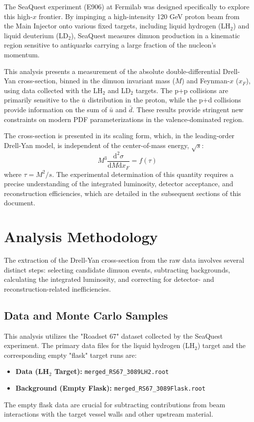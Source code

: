 \documentclass[11pt]{article}
\newcommand{\diffd}{\mathrm{d}}
\begin{document}
The SeaQuest experiment (E906) at Fermilab was designed specifically to explore this high-$x$ frontier. By impinging a high-intensity 120 GeV proton beam from the Main Injector onto various fixed targets, including liquid hydrogen (LH$_2$) and liquid deuterium (LD$_2$), SeaQuest measures dimuon production in a kinematic region sensitive to antiquarks carrying a large fraction of the nucleon's momentum.

This analysis presents a measurement of the absolute double-differential Drell-Yan cross-section, binned in the dimuon invariant mass ($M$) and Feynman-$x$ ($x_F$), using data collected with the LH$_2$ and LD$_2$ targets. The p+p collisions are primarily sensitive to the $\bar{u}$ distribution in the proton, while the p+d collisions provide information on the sum of $\bar{u}$ and $\bar{d}$. These results provide stringent new constraints on modern PDF parameterizations in the valence-dominated region.

The cross-section is presented in its scaling form, which, in the leading-order Drell-Yan model, is independent of the center-of-mass energy, $\sqrt{s}$:
\begin{equation}
    M^{3}\frac{\diffd^{2}\sigma}{\diffd M \diffd x_{F}} = f(\tau)
\end{equation}
where $\tau = M^2/s$. The experimental determination of this quantity requires a precise understanding of the integrated luminosity, detector acceptance, and reconstruction efficiencies, which are detailed in the subsequent sections of this document.

\section{Analysis Methodology}
\label{sec:methodology}
The extraction of the Drell-Yan cross-section from the raw data involves several distinct steps: selecting candidate dimuon events, subtracting backgrounds, calculating the integrated luminosity, and correcting for detector- and reconstruction-related inefficiencies.

\subsection{Data and Monte Carlo Samples}
This analysis utilizes the "Roadset 67" dataset collected by the SeaQuest experiment. The primary data files for the liquid hydrogen (LH$_2$) target and the corresponding empty "flask" target runs are:
\begin{itemize}
    \item \textbf{Data (LH$_2$ Target):} \texttt{merged\_RS67\_3089LH2.root}
    \item \textbf{Background (Empty Flask):} \texttt{merged\_RS67\_3089Flask.root}
\end{itemize}
The empty flask data are crucial for subtracting contributions from beam interactions with the target vessel walls and other upstream material.
\end{document}
